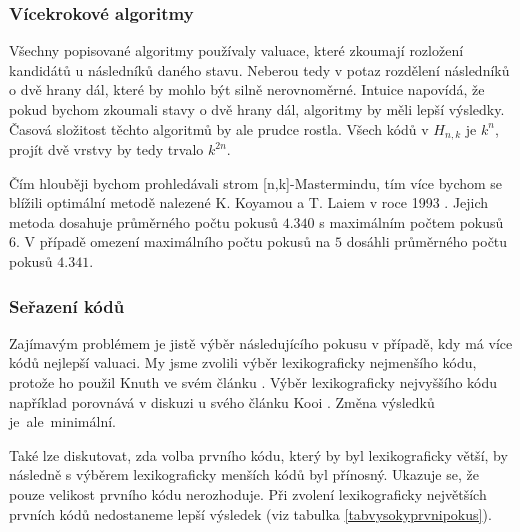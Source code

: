 
\subsubsection{Vícekrokové algoritmy}
Všechny popisované algoritmy používaly valuace, které zkoumají rozložení kandidátů u následníků daného stavu. 
Neberou tedy v potaz rozdělení následníků o dvě hrany dál, které by mohlo být silně nerovnoměrné. Intuice napovídá, že pokud bychom zkoumali stavy o dvě hrany dál, algoritmy by měli lepší výsledky. Časová složitost těchto algoritmů by ale prudce rostla. Všech kódů v $H_{n,k}$ je $k^n$, projít dvě vrstvy by tedy trvalo $k^{2n}$. 

Čím hlouběji bychom prohledávali strom [n,k]-Mastermindu, tím více bychom se blížili optimální metodě nalezené K. Koyamou a T. Laiem v roce 1993 \cite{koyama}. Jejich metoda dosahuje průměrného počtu pokusů $4.340$ s maximálním počtem pokusů $6$. V případě omezení maximálního počtu pokusů na $5$ dosáhli průměrného počtu pokusů $4.341$. 


\subsubsection{Seřazení kódů}
Zajímavým problémem je jistě výběr následujícího pokusu v případě, kdy má více kódů nejlepší valuaci. My jsme zvolili výběr lexikograficky nejmenšího kódu, protože ho použil Knuth ve svém článku \cite{donald_e__knuth_1977}. Výběr lexikograficky nejvyššího kódu například porovnává v diskuzi u svého článku Kooi \cite{kooi}. Změna výsledků je~ale~minimální. 

Také lze diskutovat, zda volba prvního kódu, který by byl lexikograficky větší, by následně s výběrem lexikograficky menších kódů byl přínosný. Ukazuje se, že pouze velikost prvního kódu nerozhoduje. Při zvolení lexikograficky největších prvních kódů nedostaneme lepší výsledek (viz tabulka \ref{tabvysokyprvnipokus}).


